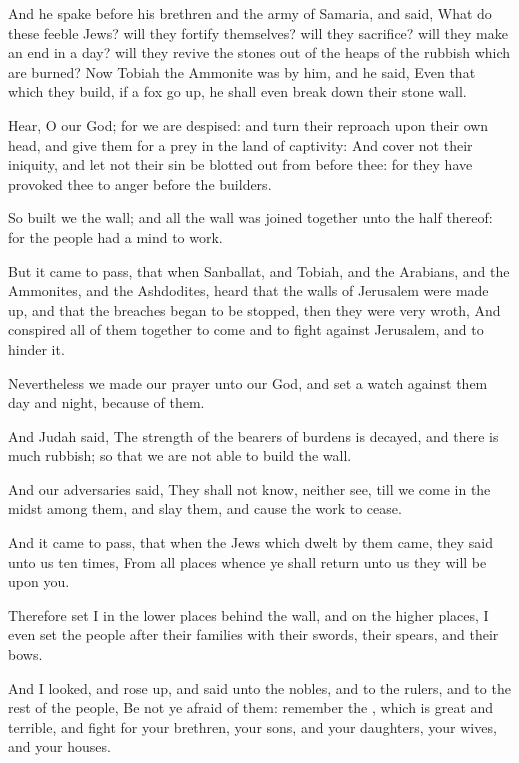 \Verse And he spake before his brethren and the army of Samaria, and said, What do these feeble Jews? will they fortify themselves? will they sacrifice?  will they make an end in a day? will they revive the stones out of the heaps of the rubbish which are burned?  \Verse Now Tobiah the Ammonite was by him, and he said, Even that which they build, if a fox go up, he shall even break down their stone wall.

\Verse Hear, O our God; for we are despised: and turn their reproach upon their own head, and give them for a prey in the land of captivity: \Verse And cover not their iniquity, and let not their sin be blotted out from before thee: for they have provoked thee to anger before the builders.

\Verse So built we the wall; and all the wall was joined together unto the half thereof: for the people had a mind to work.

\Verse But it came to pass, that when Sanballat, and Tobiah, and the Arabians, and the Ammonites, and the Ashdodites, heard that the walls of Jerusalem were made up, and that the breaches began to be stopped, then they were very wroth, \Verse And conspired all of them together to come and to fight against Jerusalem, and to hinder it.

\Verse Nevertheless we made our prayer unto our God, and set a watch against them day and night, because of them.

\Verse And Judah said, The strength of the bearers of burdens is decayed, and there is much rubbish; so that we are not able to build the wall.

\Verse And our adversaries said, They shall not know, neither see, till we come in the midst among them, and slay them, and cause the work to cease.

\Verse And it came to pass, that when the Jews which dwelt by them came, they said unto us ten times, From all places whence ye shall return unto us they will be upon you.

\Verse Therefore set I in the lower places behind the wall, and on the higher places, I even set the people after their families with their swords, their spears, and their bows.

\Verse And I looked, and rose up, and said unto the nobles, and to the rulers, and to the rest of the people, Be not ye afraid of them: remember the \LORD, which is great and terrible, and fight for your brethren, your sons, and your daughters, your wives, and your houses.

